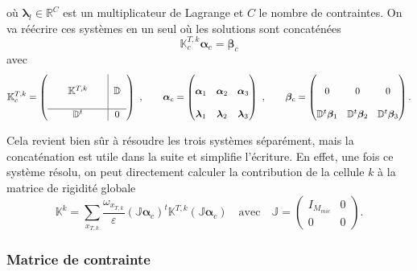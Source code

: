 \documentclass[11pt]{article}
\newcommand{\R}{\mathbb{R}}
\newcommand{\D}{\mathbb{D}}
\newcommand{\J}{\mathbb{J}}
\newcommand{\Kk}{\mathbb{K}^k}
\newcommand{\Ktk}{\mathbb{K}^{T,k}}
\newcommand{\Ktkc}{\mathbb{K}^{T, k}_c}
\newcommand{\balpha}{\bm{\alpha}}
\newcommand{\bbeta}{\bm{\beta}}
\newcommand{\blambda}{\bm{\lambda}}
\newcommand{\balphac}{\bm{\alpha}_c}
\newcommand{\bbetac}{\bm{\beta}_c}
\newcommand{\xtk}{x_{T,k}}
\begin{document}
où $\blambda_l \in \R^C$ est un multiplicateur de Lagrange et $C$ le nombre de contraintes. On va réécrire ces systèmes en un seul où les
solutions sont concaténées
\begin{equation}
  \Ktkc \balphac = \bbetac
\end{equation}
avec
\[
  \Ktkc = \left(
    \begin{tabular}{ccc|c}
      ~ & ~     & ~ & ~      \\
      ~ & $\Ktk$ & ~ & $\D$ \\
      ~ & ~     & ~ & ~      \\
      \hline
      ~ & $\D^t$  & ~ & 0
    \end{tabular}
  \right)
  ~,\qquad
  \balphac = \left(
    \begin{matrix}
      ~         & ~         & ~         \\
      \balpha_1 & \balpha_2 & \balpha_3 \\
      ~         & ~         & ~         \\
      \blambda_1 & \blambda_2 & \blambda_3
    \end{matrix}
  \right)
  ~,\qquad
    \bbetac = \left(
    \begin{matrix}
      ~          & ~          & ~ \\
      0          & 0          & 0 \\
      ~          & ~          & ~ \\
      \D^t\bbeta_1 & \D^t\bbeta_2 & \D^t\bbeta_3  
    \end{matrix}
  \right).
\]

Cela revient bien sûr à résoudre les trois systèmes séparément, mais la concaténation est utile dans la suite et simplifie l'écriture. En effet, une
fois ce système résolu, on peut directement calculer la contribution de la cellule $k$ à la matrice de rigidité globale
\[
  \Kk = \sum_{\xtk} \frac{\omega_{\xtk}}{\varepsilon} (\J\balphac)^t \Ktk (\J\balphac)
  \quad \text{avec} \quad
  \J = \left(
    \begin{matrix}
      I_{M_{mic}} & 0 \\
      0           & 0
    \end{matrix}
  \right).
\]


\subsubsection{Matrice de contrainte}
\end{document}
